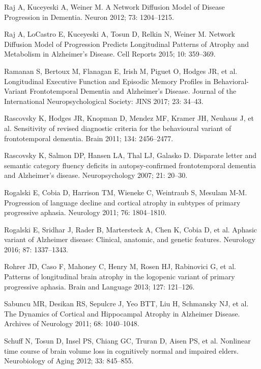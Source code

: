 \documentclass[]{article}
\begin{document}
\hypertarget{ref-raj_network_2012}{}
Raj A, Kuceyeski A, Weiner M. A Network Diffusion Model of Disease
Progression in Dementia. Neuron 2012; 73: 1204--1215.

\hypertarget{ref-raj_network_2015}{}
Raj A, LoCastro E, Kuceyeski A, Tosun D, Relkin N, Weiner M. Network
Diffusion Model of Progression Predicts Longitudinal Patterns of Atrophy
and Metabolism in Alzheimer's Disease. Cell Reports 2015; 10: 359--369.

\hypertarget{ref-ramanan_longitudinal_2017}{}
Ramanan S, Bertoux M, Flanagan E, Irish M, Piguet O, Hodges JR, et al.
Longitudinal Executive Function and Episodic Memory Profiles in
Behavioral-Variant Frontotemporal Dementia and Alzheimer's Disease.
Journal of the International Neuropsychological Society: JINS 2017; 23:
34--43.

\hypertarget{ref-rascovsky_sensitivity_2011}{}
Rascovsky K, Hodges JR, Knopman D, Mendez MF, Kramer JH, Neuhaus J, et
al. Sensitivity of revised diagnostic criteria for the behavioural
variant of frontotemporal dementia. Brain 2011; 134: 2456--2477.

\hypertarget{ref-rascovsky_disparate_2007}{}
Rascovsky K, Salmon DP, Hansen LA, Thal LJ, Galasko D. Disparate letter
and semantic category fluency deficits in autopsy-confirmed
frontotemporal dementia and Alzheimer's disease. Neuropsychology 2007;
21: 20--30.

\hypertarget{ref-rogalski_progression_2011}{}
Rogalski E, Cobia D, Harrison TM, Wieneke C, Weintraub S, Mesulam M-M.
Progression of language decline and cortical atrophy in subtypes of
primary progressive aphasia. Neurology 2011; 76: 1804--1810.

\hypertarget{ref-rogalski_aphasic_2016}{}
Rogalski E, Sridhar J, Rader B, Martersteck A, Chen K, Cobia D, et al.
Aphasic variant of Alzheimer disease: Clinical, anatomic, and genetic
features. Neurology 2016; 87: 1337--1343.

\hypertarget{ref-rohrer_patterns_2013}{}
Rohrer JD, Caso F, Mahoney C, Henry M, Rosen HJ, Rabinovici G, et al.
Patterns of longitudinal brain atrophy in the logopenic variant of
primary progressive aphasia. Brain and Language 2013; 127: 121--126.

\hypertarget{ref-sabuncu_dynamics_2011}{}
Sabuncu MR, Desikan RS, Sepulcre J, Yeo BTT, Liu H, Schmansky NJ, et al.
The Dynamics of Cortical and Hippocampal Atrophy in Alzheimer Disease.
Archives of Neurology 2011; 68: 1040--1048.

\hypertarget{ref-schuff_nonlinear_2012}{}
Schuff N, Tosun D, Insel PS, Chiang GC, Truran D, Aisen PS, et al.
Nonlinear time course of brain volume loss in cognitively normal and
impaired elders. Neurobiology of Aging 2012; 33: 845--855.
\end{document}
